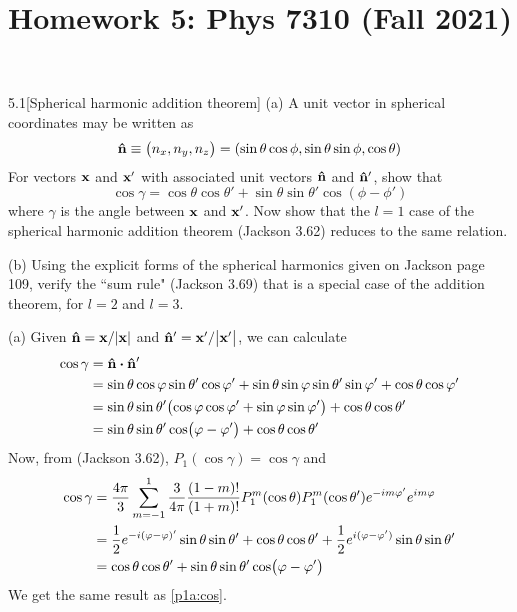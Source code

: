 \documentclass[12pt]{article}
\title{Homework 5: Phys 7310 (Fall 2021)}
\begin{document}
\maketitle 

\begin{problem}{5.1}[Spherical harmonic addition theorem]
(a) A unit vector in spherical coordinates may be written as
\begin{equation}
    \vb{\hat{n}}\equiv\qty(n_x,n_y,n_z)=\qty(\sin\theta\cos\phi,\sin\theta\sin\phi,\cos\theta) 
\end{equation}
For vectors $\vb{x}$ and $\vb{x}'$ with associated unit vectors $\vb{\hat{n}}$ and
$\vb{\hat{n}}'$, show that
\begin{equation}
    \cos\gamma=\cos\theta\cos\theta'+\sin\theta\sin\theta'\cos(\phi-\phi') 
\end{equation}
where $\gamma$ is the angle between $\vb{x}$ and $\vb{x}'$. Now show that the
$l=1$ case of the spherical harmonic addition theorem (Jackson 3.62) reduces to
the same relation.

(b) Using the explicit forms of the spherical harmonics given on Jackson page
109, verify the ``sum rule" (Jackson 3.69) that is a special case of the addition
theorem, for $l=2$ and $l=3$.
\begin{solution}
    (a) Given $\vb{\hat{n}}=\vb{x}/\abs{\vb{x}}$ and $\vb{\hat{n}}'=\vb{x}'/\abs{\vb{x}'}$, 
    we can calculate
    \begin{align}\label{p1a:cos}
    \cos\gamma
    &=\nhat\vdot\nhat'\notag\\
    &=\sin\theta\cos\varphi\sin\theta'\cos\varphi'
    +\sin\theta\sin\varphi\sin\theta'\sin\varphi'
    +\cos\theta\cos\varphi'\notag\\
    &=\sin\theta\sin\theta'\qty(\cos\varphi\cos\varphi'+\sin\varphi\sin\varphi')
    +\cos\theta\cos\theta'\notag\\
    &=\sin\theta\sin\theta'\cos(\varphi-\varphi')+\cos\theta\cos\theta'
\end{align}
Now, from (Jackson 3.62), $P_1(\cos\gamma)=\cos\gamma$ and
\begin{align}
    \cos\gamma
    &=\frac{4\pi}{3}\sum_{m=-1}^1\frac{3}{4\pi}
    \frac{(1-m)!}{(1+m)!}P_1^m(\cos\theta)P_1^m(\cos\theta')e^{-im\varphi'}e^{im\varphi}\notag\\
    &=\frac12e^{-i(\varphi-\varphi)'}\sin\theta\sin\theta'
    +\cos\theta\cos\theta'+\frac12e^{i(\varphi-\varphi')}\sin\theta\sin\theta'\notag\\
    &=\cos\theta\cos\theta'+\sin\theta\sin\theta'\cos(\varphi-\varphi')
\end{align}
We get the same result as \eqref{p1a:cos}.


\end{solution}
\end{problem}
\end{document}

